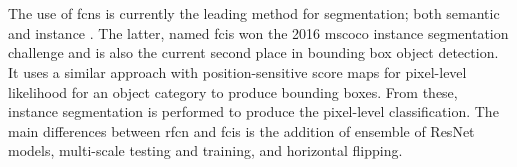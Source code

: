 \documentclass[a4paper,twoside]{article}
\begin{document}
\\\\
The use of \glspl{fcn} is currently the leading method for segmentation; both semantic \cite{semfcn} and instance \cite{instancefcn}. The latter, named \gls{fcis} won the 2016 \gls{mscoco} instance segmentation challenge and is also the current second place in bounding box object detection. It uses a similar approach with position-sensitive score maps for pixel-level likelihood for an object category to produce bounding boxes. From these, instance segmentation is performed to produce the pixel-level classification. The main differences between \gls{rfcn} and \gls{fcis} is the addition of ensemble of ResNet models, multi-scale testing and training, and horizontal flipping.


\end{document}
